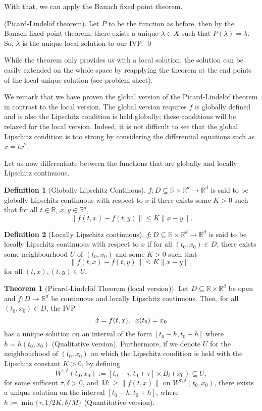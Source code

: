 \documentclass[
]{article}
\theoremstyle{definition}
\newtheorem{theorem}{Theorem}
\theoremstyle{definition}
\newtheorem{definition}{Definition}[section]
\begin{document}
With that, we can apply the Banach fixed point theorem.

\proof (Picard-Lindelöf theorem). Let \(P\) to be the function as
before, then by the Banach fixed point theorem, there exists a unique
\(\lambda \in X\) such that \(P(\lambda) = \lambda\). So, \(\lambda\) is
the unique local solution to our IVP. \qed

While the theorem only provides us with a local solution, the solution
can be easily extended on the whole space by reapplying the theorem at
the end points of the local unique solution (see problem sheet).

We remark that we have proven the global version of the Picard-Lindelöf
theorem in contrast to the local version. The global version requires
\(f\) is globally defined and is also the Lipschitz condition is held
globally; these conditions will be relaxed for the local version.
Indeed, it is not difficult to see that the global Lipschitz condition
is too strong by considering the differential equations such as
\(\dot x = tx^2\).

Let us now differentiate between the functions that are globally and
locally Lipschitz continuous.

\begin{definition}[Globally Lipschitz Continous]
  \(f : D \subseteq \mathbb{R} \times \mathbb{R}^d \to \mathbb{R}^d\) is said 
  to be globally Lipschitz continuous with respect to \(x\) if there exists some 
  \(K > 0\) such that for all \(t \in \mathbb{R}\), \(x, y \in \mathbb{R}^d\),
  \[\|f(t, x) - f(t, y)\| \le K\|x - y\|.\]
\end{definition}

\begin{definition}[Locally Lipschitz continuous]
  \(f : D \subseteq \mathbb{R} \times \mathbb{R}^d \to \mathbb{R}^d\) is said 
  to be locally Lipschitz continuous with respect to \(x\) if for all 
  \((t_0, x_0) \in D\), there exists some neighbourhood \(U\) of \((t_0, x_0)\)
  and some \(K > 0\) such that 
  \[\|f(t, x) - f(t, y)\| \le K\|x - y\|,\]
  for all \((t, x), (t, y) \in U\).
\end{definition}

\begin{theorem}[Picard-Lindelöf Theorem (local version)]
  Let \(D \subseteq \mathbb{R} \times \mathbb{R}^d\) be open and 
  \(f : D \to \mathbb{R}^d\) be continuous and locally Lipschitz continuous. 
  Then, for all \((t_0, x_0) \in D\), the IVP 
  \[\dot x = f(t, x); \hspace{2mm} x(t_0) = x_0\]
  has a unique solution on an interval of the form \([t_0 - h, t_0 + h]\) where 
  \(h = h(t_0, x_0)\) (Qualitative version). Furthermore, if we denote \(U\) for 
  the neighbourhood of \((t_0, x_0)\) on which the Lipschitz condition is held 
  with the Lipschitz constant \(K > 0\), by defining 
  \[W^{\tau, \delta}(t_0, x_0) := [t_0 - \tau, t_0 + \tau] \times 
    \overline{B_\delta(x_0)} \subseteq U,\]
  for some sufficent \(\tau, \delta > 0\), and \(M :\ge \|f(t, x)\|\) on 
  \(W^{\tau, \delta}(t_0, x_0)\), there exists a unique solution on the 
  interval \([t_0 - h, t_0 + h]\), where \(h := \min\{\tau, 1 / 2K, \delta / M\}\) 
  (Quantitative version). 
\end{theorem}
\proof
\end{document}

